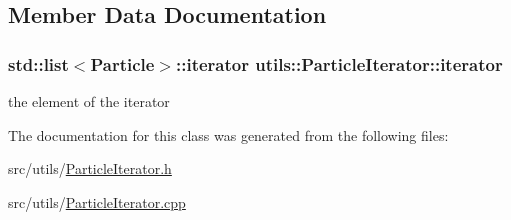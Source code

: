 \subsection{Member Data Documentation}
\hypertarget{classutils_1_1ParticleIterator_a2e8cdcdcf26e9a8e18e8f524d43531fc}{
\subsubsection[{iterator}]{\setlength{\rightskip}{0pt plus 5cm}std\-::list$<${\bf Particle}$>$\-::iterator utils\-::\-Particle\-Iterator\-::iterator\hspace{0.3cm}{\ttfamily [private]}}}\label{classutils_1_1ParticleIterator_a2e8cdcdcf26e9a8e18e8f524d43531fc}
the element of the iterator 

The documentation for this class was generated from the following files\-:\begin{DoxyCompactItemize}
\item 
src/utils/\hyperlink{ParticleIterator_8h}{Particle\-Iterator.\-h}\item 
src/utils/\hyperlink{ParticleIterator_8cpp}{Particle\-Iterator.\-cpp}\end{DoxyCompactItemize}
